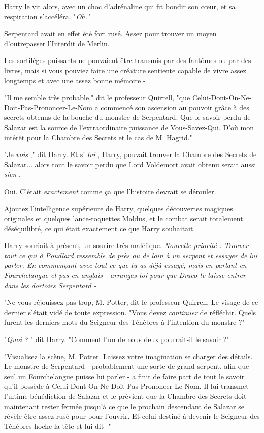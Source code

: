 Harry le vit alors, avec un choc d'adrénaline qui fit bondir son cœur, et sa respiration s'accéléra. "\emph{Oh."} 

Serpentard avait en effet été fort rusé. Assez pour trouver un moyen d'outrepasser l'Interdit de Merlin.

Les sortilèges puissants ne pouvaient être transmis par des fantômes ou par des livres, mais si vous pouviez faire une créature sentiente capable de vivre assez longtemps et avec une assez bonne mémoire -

"Il me semble très probable," dit le professeur Quirrell, "que Celui-Dont-On-Ne-Doit-Pas-Prononcer-Le-Nom a commencé son ascension au pouvoir grâce à des secrets obtenus de la bouche du monstre de Serpentard. Que le savoir perdu de Salazar est la source de l'extraordinaire puissance de Vous-Savez-Qui. D'où mon intérêt pour la Chambre des Secrets et le cas de M. Hagrid."

"Je \emph{vois} ," dit Harry. Et si \emph{lui} , Harry, pouvait trouver la Chambre des Secrets de Salazar... alors tout le savoir perdu que Lord Voldemort avait obtenu serait aussi \emph{sien} .

Oui. C'était \emph{exactement}  comme ça que l'histoire devrait se dérouler.

Ajoutez l'intelligence supérieure de Harry, quelques découvertes magiques originales et quelques lance-roquettes Moldus, et le combat serait totalement déséquilibré, ce qui était exactement ce que Harry souhaitait.

Harry souriait à présent, un sourire très maléfique. \emph{Nouvelle priorité : Trouver tout ce qui à Poudlard ressemble de près ou de loin à un serpent et essayer de lui parler. En commençant avec tout ce que tu as déjà essayé, mais en parlant en Fourchelangue et pas en anglais - arranges-toi pour que Draco te laisse entrer dans les dortoirs Serpentard -} 

"Ne vous réjouissez pas trop, M. Potter, dit le professeur Quirrell. Le visage de ce dernier s'était vidé de toute expression. "Vous devez \emph{continuer}  de réfléchir. Quels furent les derniers mots du Seigneur des Ténèbres à l'intention du monstre ?"

"\emph{Quoi ?} " dit Harry. "Comment l'un de nous deux pourrait-il le savoir ?"

"Visualisez la scène, M. Potter. Laissez votre imagination se charger des détails. Le monstre de Serpentard - probablement une sorte de grand serpent, afin que seul un Fourchelangue puisse lui parler - a finit de faire part de tout le savoir qu'il possède à Celui-Dont-On-Ne-Doit-Pas-Prononcer-Le-Nom. Il lui transmet l'ultime bénédiction de Salazar et le prévient que la Chambre des Secrets doit maintenant rester fermée jusqu'à ce que le prochain descendant de Salazar se révèle être assez rusé pour pour l'ouvrir. Et celui destiné à devenir le Seigneur des Ténèbres hoche la tête et lui dit -"

